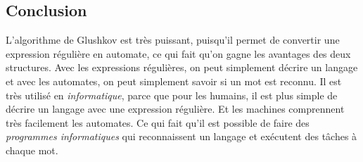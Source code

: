 \subsection{Conclusion}

L'algorithme de Glushkov est très puissant, puisqu'il permet de convertir une
expression régulière en automate, ce qui fait qu'on gagne les avantages des
deux structures. Avec les expressions régulières, on peut simplement décrire un
langage et avec les automates, on peut simplement savoir si un mot est reconnu.
Il est très utilisé en \textit{informatique}, parce que pour les humains, il
est plus simple de décrire un langage avec une expression régulière. Et les
machines comprennent très facilement les automates. Ce qui fait qu'il est
possible de faire des \textit{programmes informatiques} qui reconnaissent un
langage et exécutent des tâches à chaque mot.

